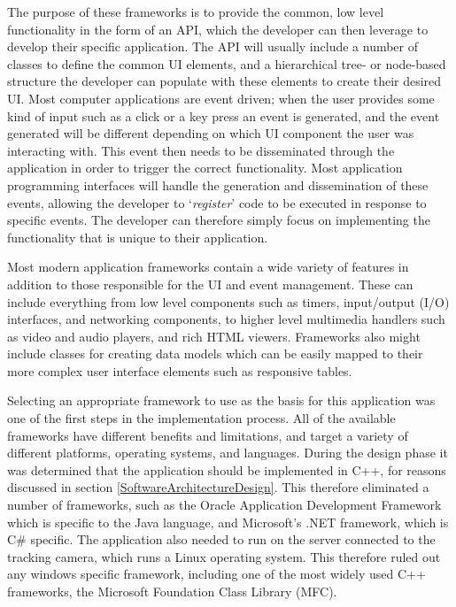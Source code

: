 The purpose of these frameworks is to provide the common, low level functionality in the form of an API, which the developer can then leverage to develop their specific application. The API will usually include a number of classes to define the common UI elements, and a hierarchical tree- or node-based structure the developer can populate with these elements to create their desired UI. Most computer applications are event driven; when the user provides some kind of input such as a click or a key press an event is generated, and the event generated will be different depending on which UI component the user was interacting with. This event then needs to be disseminated through the application in order to trigger the correct functionality. Most application programming interfaces will handle the generation and dissemination of these events, allowing the developer to `\textit{register}' code to be executed in response to specific events. The developer can therefore simply focus on implementing the functionality that is unique to their application.

Most modern application frameworks contain a wide variety of features in addition to those responsible for the UI and event management. These can include everything from low level components such as timers, input/output (I/O) interfaces, and networking components, to higher level multimedia handlers such as video and audio players, and rich HTML viewers. Frameworks also might include classes for creating data models which can be easily mapped to their more complex user interface elements such as responsive tables.

Selecting an appropriate framework to use as the basis for this application was one of the first steps in the implementation process. All of the available frameworks have different benefits and limitations, and target a variety of different platforms, operating systems, and languages. During the design phase it was determined that the application should be implemented in C++, for reasons discussed in section \ref{SoftwareArchitectureDesign}. This therefore eliminated a number of frameworks, such as the Oracle Application Development Framework which is specific to the Java language, and Microsoft's .NET framework, which is C\# specific. The application also needed to run on the server connected to the tracking camera, which runs a Linux operating system. This therefore ruled out any windows specific framework, including one of the most widely used C++ frameworks, the Microsoft Foundation Class Library (MFC).

